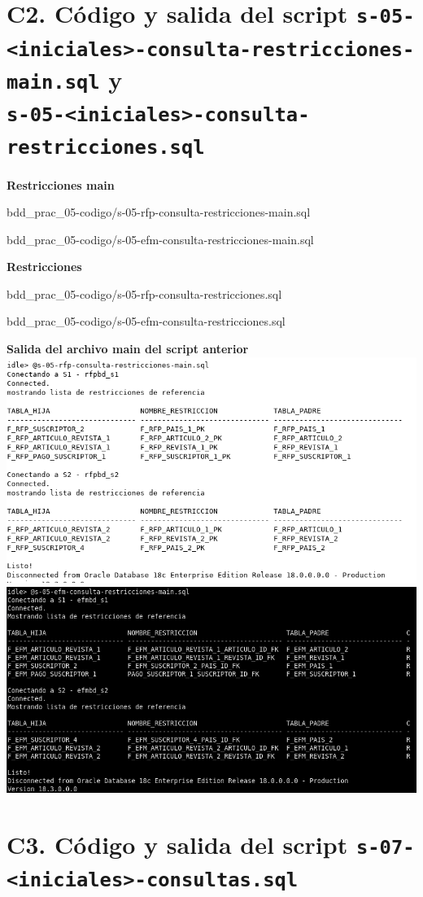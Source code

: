 \documentclass{article}
\begin{document}
\section*{C2. Código y salida del script 
\texttt{s-05-<iniciales>-consulta-restricciones-main.sql} y\\
\texttt{s-05-<iniciales>-consulta-restricciones.sql}}

\textbf{Restricciones main}


{bdd_prac_05-codigo/s-05-rfp-consulta-restricciones-main.sql}


{bdd_prac_05-codigo/s-05-efm-consulta-restricciones-main.sql}

\textbf{Restricciones}


{bdd_prac_05-codigo/s-05-rfp-consulta-restricciones.sql}


{bdd_prac_05-codigo/s-05-efm-consulta-restricciones.sql}

\textbf{Salida del archivo main del script anterior}\\
\includegraphics[width=0.8\linewidth]{bdd_prac05-c2-restricciones}
\includegraphics[width=0.8\linewidth]{bdd-p5-efm-c2}

\section*{C3. Código y salida del script 
\texttt{s-07-<iniciales>-consultas.sql}}
\end{document}
